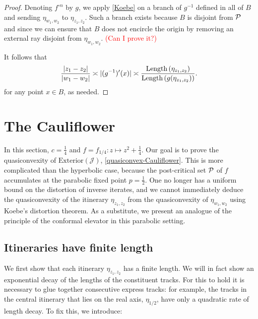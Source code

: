 \begin{proof}


Denoting $f^{\circ n}$ by $g$, 
we apply \cref{Koebe} on a branch of $g^{-1}$ defined in all of $B$ and sending $\eta_{w_1,w_2}$ to $\eta_{z_1,z_2}$.
Such a branch exists because $B$ is disjoint from $\operatorname{\mathcal P}$ and since we can ensure that $B$ does not encircle the origin by 
removing an external ray disjoint from $\eta_{w_1,w_2}$. \textcolor{red}{(Can I prove it?)}

It follows that
\begin{equation}
	\frac {|z_1-z_2|}{|w_1-w_2|} \asymp |(g^{-1})'(x)| \asymp
	\frac{\operatorname{Length}\left(\eta_{z_{1},z_{2}}\right)}{\operatorname{Length}\left(g(\eta_{z_1,z_2})\right)}.
\end{equation}
for any point $x \in B$, as needed.
\end{proof}

\section{The Cauliflower}
In this section, $c=\frac 14$ and $f=f_{1/4}: z\mapsto z^2+ \frac 14$.
Our goal is to prove the quasiconvexity of $\mathrm{Exterior}(\mathcal{J})$, \cref{quasiconvex-Cauliflower}. 
This is more complicated than the hyperbolic case, 
because the post-critical set $\operatorname{\mathcal P}$ of $f$ accumulates at the parabolic fixed point $p=\frac 12$. 
One no longer has a uniform bound on the distortion of inverse iterates, 
and we cannot immediately deduce the quasiconvexity of the itinerary $\eta_{z_1,z_2}$ from the quasiconvexity of $\eta_{w_1,w_2}$ using Koebe's distortion theorem. 
As a substitute, we present an analogue of the principle of the conformal elevator in this parabolic setting.

\subsection{Itineraries have finite length}
We first show that each itinerary $\eta_{z_1,z_2}$ has a finite length. 
We will in fact show an exponential decay of the lengths of the constituent tracks. 
For this to hold it is necessary to glue together consecutive express tracks: 
for example, the tracks in the central itinerary that lies on the real axis, $\eta_{1/2}$, 
have only a quadratic rate of length decay. To fix this, we introduce:

